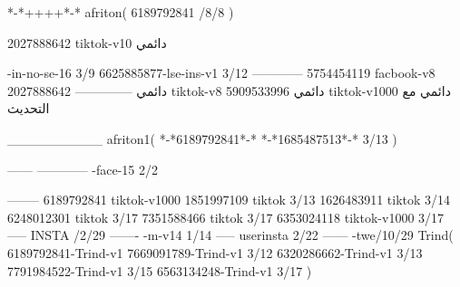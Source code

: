 *-*++++*-*
afriton(
6189792841 /8/8
)

2027888642 tiktok-v10
دائمي

-in-no-se-16 3/9
6625885877-lse-ins-v1 3/12
------------
5754454119 facbook-v8
دائمي
--------------
2027888642 tiktok-v8
دائمي
5909533996 tiktok-v1000
دائمي مع التحديث

__________
afriton1(
*-*6189792841*-*
*-*1685487513*-* 3/13
)


------
------------
-face-15 2/2

--------
6189792841 tiktok-v1000
1851997109 tiktok 3/13
1626483911 tiktok 3/14
6248012301 tiktok 3/17
7351588466 tiktok 3/17
6353024118 tiktok-v1000 3/17
-----
 INSTA /2/29
-------
-m-v14 1/14
-----
userinsta 2/22
------
-twe/10/29
Trind(
6189792841-Trind-v1 
7669091789-Trind-v1 3/12
6320286662-Trind-v1 3/13
7791984522-Trind-v1 3/15
6563134248-Trind-v1 3/17
)
